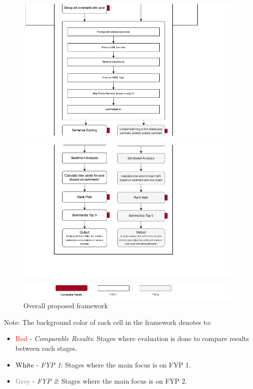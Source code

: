 \begin{figure}[H]
  \centerline{\includegraphics[scale=0.5]{slice_framework_3.png}}
\end{figure} 

\begin{figure}[H]
  \centerline{\includegraphics[scale=0.5]{slice_framework_4.png}}
\end{figure} 

\begin{figure}[H]
  \centerline{\includegraphics[scale=0.5]{slice_framework_5.png}}
  \caption{Overall proposed framework}
  \label{framework}
\end{figure}

\noindent  Note: The background color of each cell in the framework denotes to:
\begin{itemize}
  \item \textcolor{red}{Red} - \emph{Comparable Results}: Stages where evaluation is done to compare results between each stages.
  \item \textcolor{black}{White} - \emph{FYP 1}: Stages where the main focus is on FYP 1.
  \item \textcolor{gray}{Grey} - \emph{FYP 2}: Stages where the main focus is on FYP 2.
\end{itemize}

